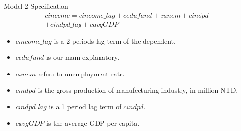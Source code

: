 \documentclass[compress]{beamer}
\begin{document}
\begin{frame}{Model 2 Specification}
  \begin{multline}
    cincome = cincome\_lag + cedufund + cunem + cindpd \\
    + cindpd\_lag + cavgGDP
  \end{multline}
  \begin{itemize}
    \item $cincome\_lag$ is a 2 periods lag term of the dependent.
    \item $cedufund$ is our main explanatory.
    \item $cunem$ refers to unemployment rate.
    \item $cindpd$ is the gross production of manufecturing industry, in million NTD.
    \item $cindpd\_lag$ is a 1 period lag term of $cindpd$.
    \item $cavgGDP$ is the average GDP per capita.
  \end{itemize}
\end{frame}
\end{document}

